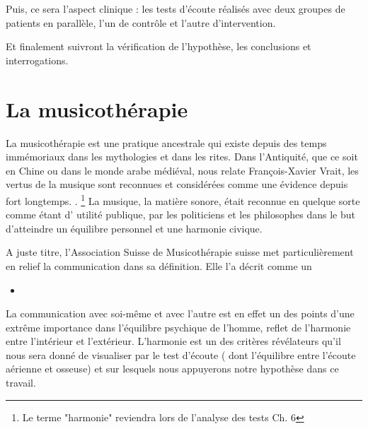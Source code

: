 Puis, ce sera l'aspect clinique : les tests d'écoute réalisés  avec deux groupes 
de patients en parallèle, l'un de contrôle et l'autre d'intervention.

Et finalement suivront la vérification de l'hypothèse, les conclusions et 
interrogations. 


	


\chapter{La musicothérapie}

La musicothérapie est une pratique ancestrale qui existe depuis des
temps immémoriaux dans les mythologies et dans les rites. Dans l'Antiquité, que ce soit en Chine ou dans le monde arabe 
médiéval, nous relate François-Xavier Vrait,  	 
les vertus de la musique sont reconnues et considérées comme une évidence depuis 
fort longtemps. 
  \autocite[ch. III, p. 
96]{vrait_musicotherapie_2018}. \footnote{Le terme "harmonie" reviendra lors de l'analyse des tests Ch. 6}
La musique, la matière sonore, était  reconnue en quelque sorte comme étant d' utilité
publique, 
par les  politiciens  et les philosophes dans le but d'atteindre un
équilibre personnel et une harmonie civique.
 	 
A juste titre, l'Association Suisse de Musicothérapie suisse met particulièrement en relief 
la communication dans sa définition. Elle l'a décrit comme un 
 
\begin{itemize}
\item {}
\end{itemize}

La communication avec soi-même et avec l'autre est en effet un des
points 
d'une extrême importance dans l'équilibre psychique de l'homme, reflet
de 
l'harmonie entre l'intérieur et l'extérieur. L'harmonie est un des  
critères révélateurs qu'il nous sera donné de visualiser par le test
d'écoute ( dont l'équilibre entre l'écoute aérienne et osseuse) et sur
lesquels 
nous appuyerons notre hypothèse  
dans ce travail.


